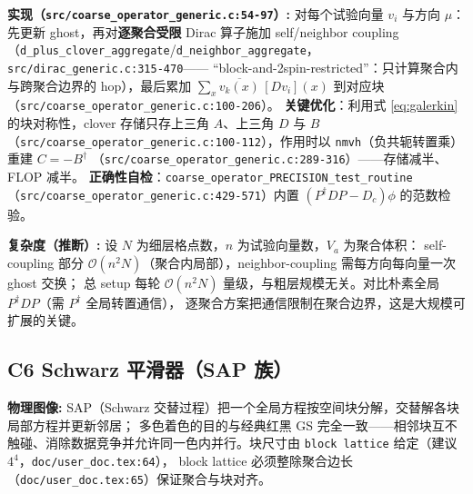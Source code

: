 \documentclass[UTF8]{ctexart}
\begin{document}
\textbf{实现（\texttt{\nolinkurl{src/coarse_operator_generic.c:54-97}}）:} 对每个试验向量 $v_i$ 与方向 $\mu$：
先更新 ghost，再对\textbf{逐聚合受限} Dirac 算子施加 self/neighbor coupling
（\nolinkurl{d_plus_clover_aggregate}/\nolinkurl{d_neighbor_aggregate}，\texttt{\nolinkurl{src/dirac_generic.c:315-470}}——
``block-and-2spin-restricted''：只计算聚合内与跨聚合边界的 hop），最后累加
$\sum_x \overline{v_k(x)}\,[D v_i](x)$ 到对应块（\texttt{\nolinkurl{src/coarse_operator_generic.c:100-206}}）。
\textbf{关键优化}：利用式 \eqref{eq:galerkin} 的块对称性，clover 存储只存上三角 $A$、上三角 $D$ 与 $B$
（\texttt{\nolinkurl{src/coarse_operator_generic.c:100-112}}），作用时以 \texttt{nmvh}（负共轭转置乘）重建 $C=-B^\dagger$
（\texttt{\nolinkurl{src/coarse_operator_generic.c:289-316}}）——存储减半、FLOP 减半。
\textbf{正确性自检}：\texttt{coarse\_operator\_PRECISION\_test\_routine}
（\texttt{\nolinkurl{src/coarse_operator_generic.c:429-571}}）内置 $(P^\dagger D P - D_c)\phi$ 的范数检验。

\textbf{复杂度（推断）:} 设 $N$ 为细层格点数，$n$ 为试验向量数，$V_a$ 为聚合体积：
self-coupling 部分 $\mathcal{O}(n^2 N)$（聚合内局部），neighbor-coupling 需每方向每向量一次 ghost 交换；
总 setup 每轮 $\mathcal{O}(n^2 N)$ 量级，与粗层规模无关。对比朴素全局 $P^\dagger D P$（需 $P^\dagger$ 全局转置通信），
逐聚合方案把通信限制在聚合边界，这是大规模可扩展的关键。

\subsection{C6 Schwarz 平滑器（SAP 族）}
\begin{physbox}
\textbf{物理图像:} SAP（Schwarz 交替过程）把一个全局方程按空间块分解，交替解各块局部方程并更新邻居；
多色着色的目的与经典红黑 GS 完全一致——相邻块互不触碰、消除数据竞争并允许同一色内并行。块尺寸由
\texttt{block lattice} 给定（建议 $4^4$，\texttt{\nolinkurl{doc/user_doc.tex:64}}），
block lattice 必须整除聚合边长（\texttt{\nolinkurl{doc/user_doc.tex:65}}）保证聚合与块对齐。
\end{physbox}
\end{document}
